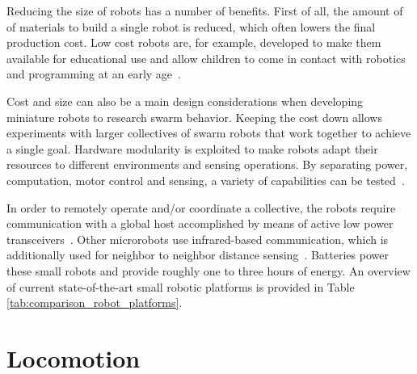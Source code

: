 




Reducing the size of robots has a number of benefits.
First of all, the amount of of materials to build a single robot is reduced, which often lowers the final production cost.
Low cost robots are, for example, developed to make them available for educational use and allow children to come in contact with robotics and programming at an early age~\cite{rubenstein_icra_2015}.

Cost and size can also be a main design considerations when developing miniature robots to research swarm behavior.
Keeping the cost down allows experiments with larger collectives of swarm robots that work together to achieve a single goal.
Hardware modularity is exploited to make robots adapt their resources to different environments and sensing operations.
By separating power, computation, motor control and sensing, a variety of capabilities can be tested~\cite{sabelhaus_icra_2013, pickem_icra_2015, kim_iros_2016}.

In order to remotely operate and/or coordinate a collective, the robots require communication with a global host accomplished by means of active low power transceivers~\cite{sabelhaus_icra_2013, pickem_icra_2015, kim_iros_2016}. 
Other microrobots use infrared-based communication, which is additionally used for neighbor to neighbor distance sensing~\cite{rubenstein_icra_2012}.
Batteries power these small robots and provide roughly one to three hours of energy.
An overview of current state-of-the-art small robotic platforms is provided in Table \ref{tab:comparison_robot_platforms}.


\section{Locomotion}
\label{sec:rw_locomotion}

